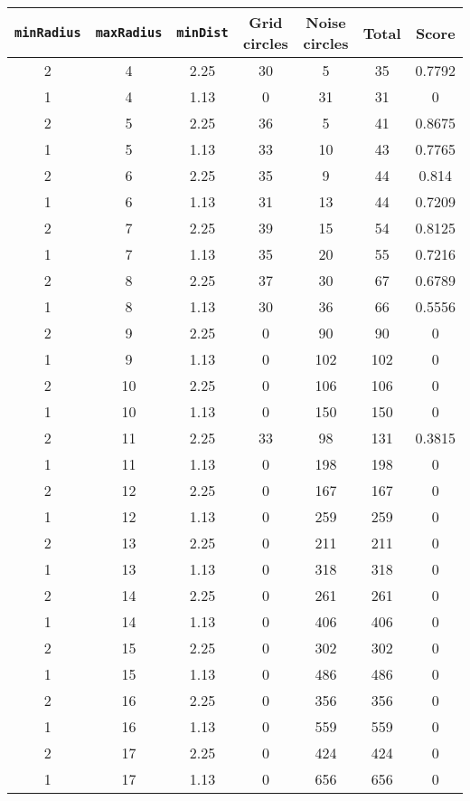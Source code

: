\documentclass[letterpaper, 12pt]{article}
\begin{document}
\begin{longtable}{|c|c|c|c|c|c|c|}
\hline
\textbf{\texttt{minRadius}} & \textbf{\texttt{maxRadius}} & \textbf{\texttt{minDist}} & \textbf{Grid circles} & \textbf{Noise circles} & \textbf{Total} & \textbf{Score} \\
\hline
2 & 4 & 2.25 & 30 & 5 & 35 & 0.7792 \\
\hline
1 & 4 & 1.13 & 0 & 31 & 31 & 0 \\
\hline
2 & 5 & 2.25 & 36 & 5 & 41 & 0.8675 \\
\hline
1 & 5 & 1.13 & 33 & 10 & 43 & 0.7765 \\
\hline
2 & 6 & 2.25 & 35 & 9 & 44 & 0.814 \\
\hline
1 & 6 & 1.13 & 31 & 13 & 44 & 0.7209 \\
\hline
2 & 7 & 2.25 & 39 & 15 & 54 & 0.8125 \\
\hline
1 & 7 & 1.13 & 35 & 20 & 55 & 0.7216 \\
\hline
2 & 8 & 2.25 & 37 & 30 & 67 & 0.6789 \\
\hline
1 & 8 & 1.13 & 30 & 36 & 66 & 0.5556 \\
\hline
2 & 9 & 2.25 & 0 & 90 & 90 & 0 \\
\hline
1 & 9 & 1.13 & 0 & 102 & 102 & 0 \\
\hline
2 & 10 & 2.25 & 0 & 106 & 106 & 0 \\
\hline
1 & 10 & 1.13 & 0 & 150 & 150 & 0 \\
\hline
2 & 11 & 2.25 & 33 & 98 & 131 & 0.3815 \\
\hline
1 & 11 & 1.13 & 0 & 198 & 198 & 0 \\
\hline
2 & 12 & 2.25 & 0 & 167 & 167 & 0 \\
\hline
1 & 12 & 1.13 & 0 & 259 & 259 & 0 \\
\hline
2 & 13 & 2.25 & 0 & 211 & 211 & 0 \\
\hline
1 & 13 & 1.13 & 0 & 318 & 318 & 0 \\
\hline
2 & 14 & 2.25 & 0 & 261 & 261 & 0 \\
\hline
1 & 14 & 1.13 & 0 & 406 & 406 & 0 \\
\hline
2 & 15 & 2.25 & 0 & 302 & 302 & 0 \\
\hline
1 & 15 & 1.13 & 0 & 486 & 486 & 0 \\
\hline
2 & 16 & 2.25 & 0 & 356 & 356 & 0 \\
\hline
1 & 16 & 1.13 & 0 & 559 & 559 & 0 \\
\hline
2 & 17 & 2.25 & 0 & 424 & 424 & 0 \\
\hline
1 & 17 & 1.13 & 0 & 656 & 656 & 0 \\

\end{longtable}
\end{document}
